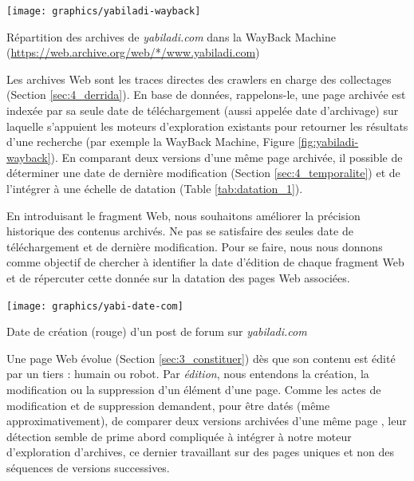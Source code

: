 \documentclass[symmetric,justified,marginals=raggedouter]{tufte-book}
\begin{document}
\begin{marginfigure}%
  \texttt{[image: graphics/yabiladi-wayback]}
  \caption{Répartition des archives de \textit{yabiladi.com} dans la WayBack Machine (\url{https://web.archive.org/web/*/www.yabiladi.com})}
  \label{fig:yabiladi-wayback}
\end{marginfigure}

\noindent Les archives Web sont les traces directes des crawlers en charge des collectages (Section \ref{sec:4_derrida}). En base de données, rappelons-le, une page archivée est indexée par sa seule date de téléchargement (aussi appelée date d'archivage) sur laquelle s'appuient les moteurs d'exploration existants pour retourner les résultats d'une recherche (par exemple la WayBack Machine, Figure \ref{fig:yabiladi-wayback}). En comparant deux versions d'une même page archivée, il possible de déterminer une date de dernière modification (Section \ref{sec:4_temporalite}) et de l'intégrer à une échelle de datation (Table \ref{tab:datation_1}). 

En introduisant le fragment Web, nous souhaitons améliorer la précision historique des contenus archivés. Ne pas se satisfaire des seules date de téléchargement et de dernière modification. Pour se faire, nous nous donnons comme objectif de chercher à identifier la date d'édition de chaque fragment Web et de répercuter cette donnée sur la datation des pages Web associées. 

\begin{marginfigure}%
  \texttt{[image: graphics/yabi-date-com]}
  \caption{Date de création (rouge) d'un post de forum sur \textit{yabiladi.com}}
  \label{fig:yabi-date-com}
\end{marginfigure} 

Une page Web évolue (Section \ref{sec:3_constituer}) dès que son contenu est édité par un tiers : humain ou robot. Par \textit{édition}, nous entendons la création, la modification ou la suppression d'un élément d'une page. Comme les actes de modification et de suppression demandent, pour être datés (même approximativement), de comparer deux versions archivées d'une même page \citep{rocco_page_2003, nunes_using_2007}, leur détection semble de prime abord compliquée à intégrer à notre moteur d'exploration d'archives, ce dernier travaillant sur des pages uniques et non des séquences de versions successives. 
\end{document}
